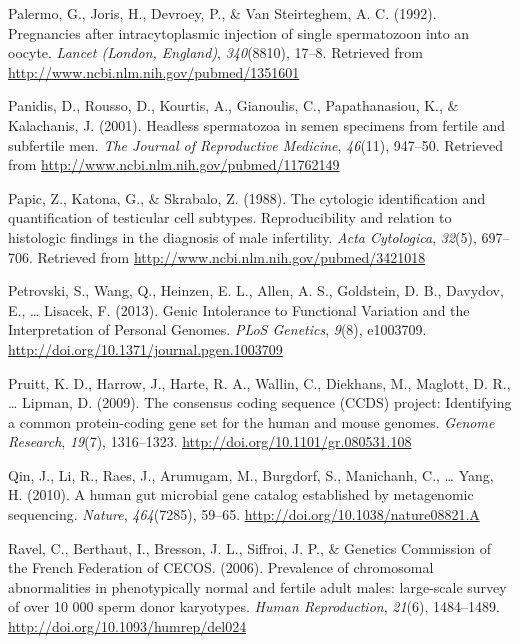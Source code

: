 \documentclass[12pt,twoside]{reedthesis}
\theoremstyle{definition}
\theoremstyle{definition}
\theoremstyle{remark}
\begin{document}
  \hypertarget{ref-Palermo1992}{}
  Palermo, G., Joris, H., Devroey, P., \& Van Steirteghem, A. C. (1992).
  Pregnancies after intracytoplasmic injection of single spermatozoon into
  an oocyte. \emph{Lancet (London, England)}, \emph{340}(8810), 17--8.
  Retrieved from \url{http://www.ncbi.nlm.nih.gov/pubmed/1351601}
  
  \hypertarget{ref-Panidis2001}{}
  Panidis, D., Rousso, D., Kourtis, A., Gianoulis, C., Papathanasiou, K.,
  \& Kalachanis, J. (2001). Headless spermatozoa in semen specimens from
  fertile and subfertile men. \emph{The Journal of Reproductive Medicine},
  \emph{46}(11), 947--50. Retrieved from
  \url{http://www.ncbi.nlm.nih.gov/pubmed/11762149}
  
  \hypertarget{ref-Papic}{}
  Papic, Z., Katona, G., \& Skrabalo, Z. (1988). The cytologic
  identification and quantification of testicular cell subtypes.
  Reproducibility and relation to histologic findings in the diagnosis of
  male infertility. \emph{Acta Cytologica}, \emph{32}(5), 697--706.
  Retrieved from \url{http://www.ncbi.nlm.nih.gov/pubmed/3421018}
  
  \hypertarget{ref-Petrovski2013}{}
  Petrovski, S., Wang, Q., Heinzen, E. L., Allen, A. S., Goldstein, D. B.,
  Davydov, E., \ldots{} Lisacek, F. (2013). Genic Intolerance to
  Functional Variation and the Interpretation of Personal Genomes.
  \emph{PLoS Genetics}, \emph{9}(8), e1003709.
  \url{http://doi.org/10.1371/journal.pgen.1003709}
  
  \hypertarget{ref-Pruitt2009}{}
  Pruitt, K. D., Harrow, J., Harte, R. A., Wallin, C., Diekhans, M.,
  Maglott, D. R., \ldots{} Lipman, D. (2009). The consensus coding
  sequence (CCDS) project: Identifying a common protein-coding gene set
  for the human and mouse genomes. \emph{Genome Research}, \emph{19}(7),
  1316--1323. \url{http://doi.org/10.1101/gr.080531.108}
  
  \hypertarget{ref-Qin2010}{}
  Qin, J., Li, R., Raes, J., Arumugam, M., Burgdorf, S., Manichanh, C.,
  \ldots{} Yang, H. (2010). A human gut microbial gene catalog established
  by metagenomic sequencing. \emph{Nature}, \emph{464}(7285), 59--65.
  \url{http://doi.org/10.1038/nature08821.A}
  
  \hypertarget{ref-Ravel2006}{}
  Ravel, C., Berthaut, I., Bresson, J. L., Siffroi, J. P., \& Genetics
  Commission of the French Federation of CECOS. (2006). Prevalence of
  chromosomal abnormalities in phenotypically normal and fertile adult
  males: large-scale survey of over 10 000 sperm donor karyotypes.
  \emph{Human Reproduction}, \emph{21}(6), 1484--1489.
  \url{http://doi.org/10.1093/humrep/del024}
  
\end{document}
